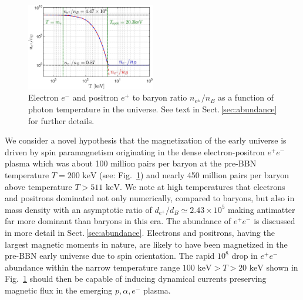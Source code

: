\documentclass[reprint]{revtex4-2}
\newcommand*{\keV}{\text{ keV}}
\newcommand{\rf}[1]{Fig.~{\ref{#1}}}
\newcommand{\rsec}[1]{Sect.\,{\ref{#1}}}
\begin{document}
\begin{figure}[ht]
    \centering
\includegraphics[width=0.5\textwidth]{plots/EEPlasmaDensityRatio_new01.jpg}
    \caption{Electron $e^{-}$ and positron $e^{+}$ to baryon ratio $n_{e^{\pm}}/n_{B}$ as a function of photon temperature in the universe. See text in \rsec{sec:abundance} for further details.}
    \label{fig:densityratio} 
\end{figure}

We consider a novel hypothesis that the magnetization of the early universe is driven by spin paramagnetism originating in the dense electron-positron $e^{+}e^{-}$ plasma which was about 100 million pairs per baryon at the pre-BBN temperature $T=200\keV$ (see: \rf{fig:densityratio}) and nearly 450 million pairs per baryon above temperature $T>511\keV$. We note at high temperatures that electrons and positrons dominated not only numerically, compared to baryons, but also in mass density with an asymptotic ratio of $d_{e^{+}}/d_{B}\simeq2.43\times10^{5}$ making antimatter far more dominant than baryons in this era. The abundance of $e^{+}e^{-}$ is discussed in more detail in \rsec{sec:abundance}. Electrons and positrons, having the largest magnetic moments in nature, are likely to have been magnetized in the pre-BBN early universe due to spin orientation. The rapid $10^{8}$ drop in $e^{+}e^{-}$ abundance within the narrow temperature range $100\keV>T>20\keV$ shown in \rf{fig:densityratio} should then be capable of inducing dynamical currents preserving magnetic flux in the emerging $p,\alpha,e^-$ plasma.
\end{document}

